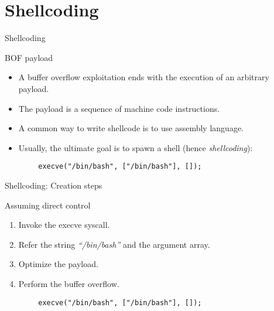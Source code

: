 \section{Shellcoding}
\begin{frame}[fragile]{Shellcoding}
	\begin{block}{BOF payload}
		\begin{itemize}
			\item A buffer overflow exploitation ends with the execution of an arbitrary payload.
			\item The payload is a sequence of machine code instructions.
			\item A common way to write shellcode is to use assembly language.
			\item Usually, the ultimate goal is to spawn a shell (hence \emph{shellcoding}):
		\end{itemize}
	\end{block}
	\ccode
	\begin{lstlisting}
		execve("/bin/bash", ["/bin/bash"], []);
	\end{lstlisting}
\end{frame}

\begin{frame}[fragile]{Shellcoding: Creation steps}
	\begin{block}{Assuming direct control}
		\begin{enumerate}
			\item Invoke the execve syscall.
			\item Refer the string \emph{``/bin/bash''} and the argument array.
			\item Optimize the payload.
			\item Perform the buffer overflow.
		\end{enumerate}
	\end{block}
	\ccode
	\begin{lstlisting}
		execve("/bin/bash", ["/bin/bash"], []);
	\end{lstlisting}
\end{frame}


